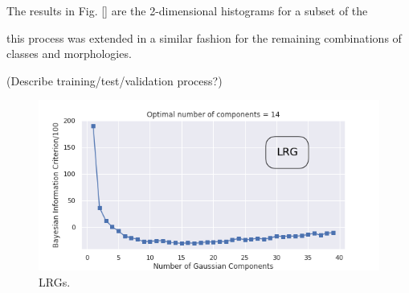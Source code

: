 The results in Fig. \ref{} are the 2-dimensional histograms for a subset of the 

this process was extended in a similar fashion for the remaining combinations of classes and morphologies. 


(Describe training/test/validation process?)



\begin{figure}
  \centering
  \includegraphics[width=\textwidth]{images/gmm/lrgDev_bic.png}
  \caption{LRGs.}
  \label{fig:lrg_bic}
\end{figure}

